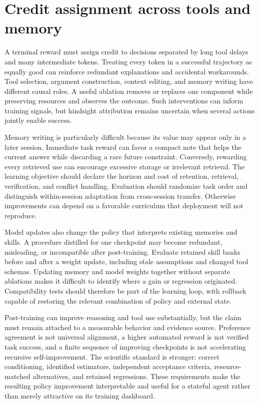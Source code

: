 \section{Credit assignment across tools and memory}
\label{sec:C08:credit}
A terminal reward must assign credit to decisions separated by long tool delays and many intermediate tokens. Treating every token in a successful trajectory as equally good can reinforce redundant explanations and accidental workarounds. Tool selection, argument construction, context editing, and memory writing have different causal roles. A useful ablation removes or replaces one component while preserving resources and observes the outcome. Such interventions can inform training signals, but hindsight attribution remains uncertain when several actions jointly enable success.

Memory writing is particularly difficult because its value may appear only in a later session. Immediate task reward can favor a compact note that helps the current answer while discarding a rare future constraint. Conversely, rewarding every retrieved use can encourage excessive storage or irrelevant retrieval. The learning objective should declare the horizon and cost of retention, retrieval, verification, and conflict handling. Evaluation should randomize task order and distinguish within-session adaptation from cross-session transfer. Otherwise improvements can depend on a favorable curriculum that deployment will not reproduce.

Model updates also change the policy that interprets existing memories and skills. A procedure distilled for one checkpoint may become redundant, misleading, or incompatible after post-training. Evaluate retained skill banks before and after a weight update, including stale assumptions and changed tool schemas. Updating memory and model weights together without separate ablations makes it difficult to identify where a gain or regression originated. Compatibility tests should therefore be part of the learning loop, with rollback capable of restoring the relevant combination of policy and external state.

Post-training can improve reasoning and tool use substantially, but the claim must remain attached to a measurable behavior and evidence source. Preference agreement is not universal alignment, a higher automated reward is not verified task success, and a finite sequence of improving checkpoints is not accelerating recursive self-improvement. The scientific standard is stronger: correct conditioning, identified estimators, independent acceptance criteria, resource-matched alternatives, and retained regressions. These requirements make the resulting policy improvement interpretable and useful for a stateful agent rather than merely attractive on its training dashboard.
